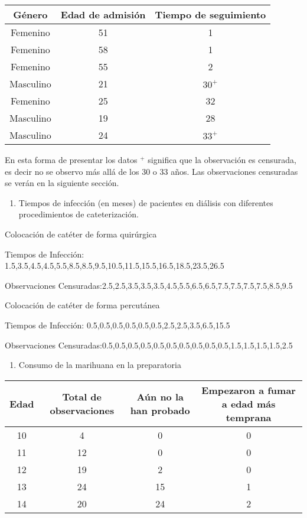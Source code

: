 \documentclass[
  a4paper,
  oneside,
  openany]{book}
\providecommand{\tightlist}{%
  \setlength{\itemsep}{0pt}\setlength{\parskip}{0pt}}
\begin{document}
\begin{table}
\centering
\begin{tabular}{>{}c|>{}c|c}
\toprule
Género & Edad de admisión & Tiempo de seguimiento\\
\midrule
Femenino & 51 & 1\\
Femenino & 58 & 1\\
Femenino & 55 & 2\\
Masculino & 21 & $30^+$\\
Femenino & 25 & 32\\
\addlinespace
Masculino & 19 & 28\\
Masculino & 24 & $33^+$\\
\bottomrule
\end{tabular}
\end{table}

En esta forma de presentar los datos \(^+\) significa que la observación es censurada, es decir no se observo más allá de los 30 o 33 años. Las observaciones censuradas se verán en la siguiente sección.

\begin{enumerate}
\def\labelenumi{\arabic{enumi}.}
\setcounter{enumi}{1}
\tightlist
\item
  Tiempos de infección (en meses) de pacientes en diálisis con diferentes procedimientos de cateterización.
\end{enumerate}

Colocación de catéter de forma quirúrgica

Tiempos de Infección: 1.5,3.5,4.5,4.5,5.5,8.5,8.5,9.5,10.5,11.5,15.5,16.5,18.5,23.5,26.5

Observaciones Censuradas:2.5,2.5,3.5,3.5,3.5,4.5,5.5,6.5,6.5,7.5,7.5,7.5,7.5,8.5,9.5

Colocación de catéter de forma percutánea

Tiempos de Infección: 0.5,0.5,0.5,0.5,0.5,0.5,2.5,2.5,3.5,6.5,15.5

Observaciones Censuradas:0.5,0.5,0.5,0.5,0.5,0.5,0.5,0.5,0.5,0.5,1.5,1.5,1.5,1.5,2.5

\begin{enumerate}
\def\labelenumi{\arabic{enumi}.}
\setcounter{enumi}{2}
\tightlist
\item
  Consumo de la marihuana en la preparatoria
\end{enumerate}

\begin{table}
\centering
\begin{tabular}{>{}c|>{}c|>{}c|c}
\toprule
Edad & Total de observaciones & Aún no la han probado & Empezaron a fumar a edad más temprana\\
\midrule
10 & 4 & 0 & 0\\
11 & 12 & 0 & 0\\
12 & 19 & 2 & 0\\
13 & 24 & 15 & 1\\
14 & 20 & 24 & 2\\
\bottomrule
\end{tabular}
\end{table}
\end{document}
